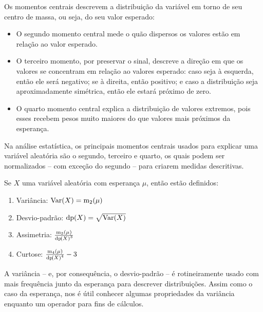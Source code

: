 Os momentos centrais descrevem a distribuição da variável em torno de seu centro de massa,
ou seja, do seu valor esperado:

\begin{itemize}
\item O segundo momento central mede o quão dispersos os valores estão em relação ao valor
esperado.

\item O terceiro momento, por preservar o sinal, descreve a direção em que os valores
se concentram em relação ao valores esperado: caso seja à esquerda, então ele será
negativo; se à direita, então positivo; e caso a distribuição seja aproximadamente
simétrica, então ele estará próximo de zero.

\item O quarto momento central explica a distribuição de valores extremos, pois esses
recebem pesos muito maiores do que valores mais próximos da esperança.
\end{itemize}

Na análise estatística, os principais momentos centrais usados para explicar uma variável
aleatória são o segundo, terceiro e quarto, os quais podem ser normalizados -- com exceção
do segundo -- para criarem medidas descritivas.

\begin{def:momentos importantes}
Se $X$ uma variável aleatória com esperança $\mu$, então estão definidos:
\begin{enumerate}
	\item Variância: $\mathrm{Var}\!\left(X\right) = \mathrm{m}_2(\mu)$
	\item Desvio-padrão: $\mathrm{dp}\!\left(X\right) = \sqrt{\mathrm{Var}\!\left(X\right)}$
	\item Assimetria: $\frac{\mathrm{m}_3(\mu)}{\mathrm{dp}\!\left(X\right)^3}$
	\item Curtose: $\frac{\mathrm{m}_4(\mu)}{\mathrm{dp}\!\left(X\right)^4} - 3   $
\end{enumerate}
\end{def:momentos importantes}

A variância -- e, por consequência, o desvio-padrão -- é rotineiramente usado com mais
frequência junto da esperança para descrever distribuições.
Assim como o caso da esperança, nos é útil conhecer algumas propriedades da variância
enquanto um operador para fins de cálculos.

